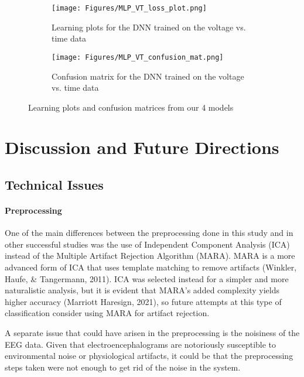 \documentclass[fleqn,10pt]{SelfArx} %
\begin{document}
\begin{figure*}
\begin{subfigure}[b]{0.35\linewidth}
        \centering
        \texttt{[image: Figures/MLP\_VT\_loss\_plot.png]} %
        \caption{Learning plots for the DNN trained on the voltage vs. time data}
        \label{fig:MLP_VT_loss_plot.png}
    \end{subfigure}
    \begin{subfigure}[b]{0.35\linewidth} %
        \centering
        \texttt{[image: Figures/MLP\_VT\_confusion\_mat.png]} %
        \caption{Confusion matrix for the DNN trained on the voltage vs. time data}
        \label{fig:MLP_VT_confusion_mat.png}
    \end{subfigure}
    \caption{Learning plots and confusion matrices from our 4 models}
    \label{fig:results}
\end{figure*}

\section{Discussion and Future Directions}
\subsection{Technical Issues}
\paragraph{Preprocessing}
One of the main differences between the preprocessing done in this study and in other successful studies was the use of Independent Component Analysis (ICA) instead of the Multiple Artifact Rejection Algorithm (MARA). MARA is a more advanced form of ICA that uses template matching to remove artifacts (Winkler, Haufe, \& Tangermann, 2011). ICA was selected instead for a simpler and more naturalistic analysis, but it is evident that MARA's added complexity yields higher accuracy (Marriott Haresign, 2021), so future attempts at this type of classification consider using MARA for artifact rejection.  

A separate issue that could have arisen in the preprocessing is the noisiness of the EEG data. Given that electroencephalograms are notoriously susceptible to environmental noise or physiological artifacts, it could be that the preprocessing steps taken were not enough to get rid of the noise in the system.
\end{document}
